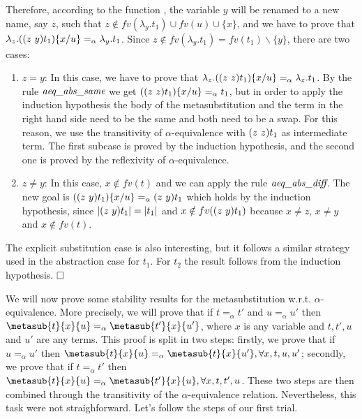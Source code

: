 Therefore, according to the function , the variable $y$ will be renamed to a new name, say $z$, such that $z \notin fv(\lambda_y.t_1) \cup fv(u) \cup \{x\}$, and we have to prove that $\lambda_z.((z\ y) t_1)\{x / u\} =_\alpha \lambda_y.t_1$. Since $z \notin fv(\lambda_y.t_1) = fv(t_1)\backslash \{y\}$, there are two cases:
 \begin{enumerate}
   \item $z = y$: In this case, we have to prove that $\lambda_z.((z\ z) t_1)\{x / u\} =_\alpha \lambda_z.t_1$. By the rule $\mbox{\it aeq}\_\mbox{\it abs}\_\mbox{\it same}$ we get $((z\ z) t_1)\{x / u\} =_\alpha t_1$, but in order to apply the induction hypothesis the body of the metasubstitution and the term in the right hand side need to be the same and both need to be a swap. For this reason, we use the transitivity of $\alpha$-equivalence with $(z\ z) t_1$ as intermediate term. The first subcase is proved by the induction hypothesis, and the second one is proved by the reflexivity of $\alpha$-equivalence.
\item $z \neq y$: In this case, $x \notin fv(t)$ and we can apply the rule $\mbox{\it aeq}\_\mbox{\it abs}\_\mbox{\it diff}$. The new goal is $((z\ y) t_1)\{x / u\} =_\alpha (z\ y) t_1$ which holds by the induction hypothesis, since $|(z\ y) t_1| = |t_1|$ and $x \notin fv((z\ y) t_1)$ because $x \neq z$, $x \neq y$ and $x \notin fv(t)$.
  \end{enumerate}
 The explicit substitution case is also interesting, but it follows a similar strategy used in the abstraction case for $t_1$. For $t_2$ the result follows from the induction hypothesis. $\hfill\Box$ 
\begin{coqdoccode}
\coqdocemptyline
\coqdocemptyline
\end{coqdoccode}
We will now prove some stability results for the metasubstitution w.r.t. $\alpha$-equivalence. More precisely, we will prove that if $t =_\alpha t'$ and $u =_\alpha u'$ then $\metasub{t}{x}{u} =_\alpha \metasub{t'}{x}{u'}$, where $x$ is any variable and $t, t', u$ and $u'$ are any  terms. This proof is split in two steps: firstly, we prove that if $u =_\alpha u'$ then $\metasub{t}{x}{u} =_\alpha \metasub{t}{x}{u'}, \forall x, t, u, u'$; secondly, we prove that if $t =_\alpha t'$ then $\metasub{t}{x}{u} =_\alpha \metasub{t'}{x}{u}, \forall x, t, t', u$. These two steps are then combined through the transitivity of the $\alpha$-equivalence relation. Nevertheless, this task were not straighforward. Let's follow the steps of our first trial.
